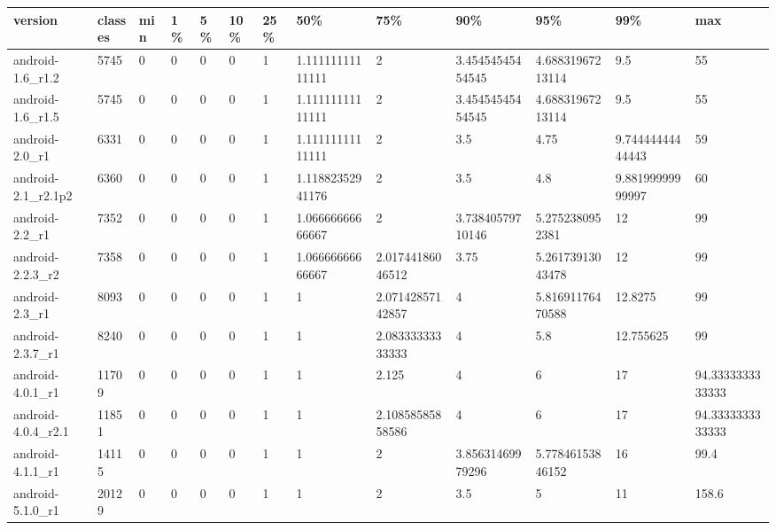 \begin{tabular}{|l|l|l|l|l|l|l|l|l|l|l|l|l|}
\hline
version&classes&min&1\%&5\%&10\%&25\%&50\%&75\%&90\%&95\%&99\%&max\\
\hline
android-1.6\_r1.2&5745&0&0&0&0&1&1.11111111111111&2&3.45454545454545&4.68831967213114&9.5&55\\
\hline
android-1.6\_r1.5&5745&0&0&0&0&1&1.11111111111111&2&3.45454545454545&4.68831967213114&9.5&55\\
\hline
android-2.0\_r1&6331&0&0&0&0&1&1.11111111111111&2&3.5&4.75&9.74444444444443&59\\
\hline
android-2.1\_r2.1p2&6360&0&0&0&0&1&1.11882352941176&2&3.5&4.8&9.88199999999997&60\\
\hline
android-2.2\_r1&7352&0&0&0&0&1&1.06666666666667&2&3.73840579710146&5.2752380952381&12&99\\
\hline
android-2.2.3\_r2&7358&0&0&0&0&1&1.06666666666667&2.01744186046512&3.75&5.26173913043478&12&99\\
\hline
android-2.3\_r1&8093&0&0&0&0&1&1&2.07142857142857&4&5.81691176470588&12.8275&99\\
\hline
android-2.3.7\_r1&8240&0&0&0&0&1&1&2.08333333333333&4&5.8&12.755625&99\\
\hline
android-4.0.1\_r1&11709&0&0&0&0&1&1&2.125&4&6&17&94.3333333333333\\
\hline
android-4.0.4\_r2.1&11851&0&0&0&0&1&1&2.10858585858586&4&6&17&94.3333333333333\\
\hline
android-4.1.1\_r1&14115&0&0&0&0&1&1&2&3.85631469979296&5.77846153846152&16&99.4\\
\hline
android-5.1.0\_r1&20129&0&0&0&0&1&1&2&3.5&5&11&158.6\\
\hline
\end{tabular}
